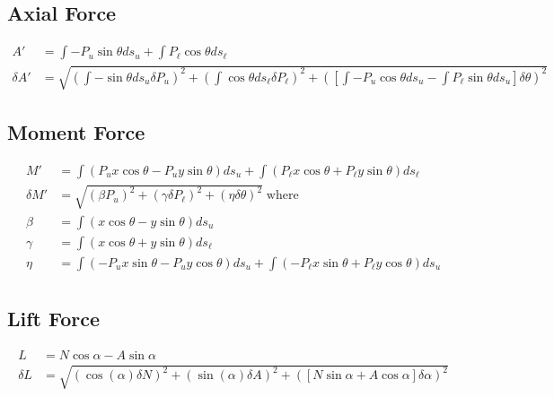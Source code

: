 \documentclass[runningheads]{llncs}
\begin{document}
\subsection{Axial Force}


\begin{align*}
    A' &= \int-P_u\sin\theta ds_u + \int P_\ell\cos\theta ds_\ell \\
    \delta A' &= \sqrt{\left(\int-\sin\theta ds_u\delta P_u\right)^2 + \left(\int\cos\theta ds_\ell\delta P_\ell\right)^2 + \left(\left[\int -P_u\cos\theta ds_u - \int P_\ell\sin\theta ds_u\right]\delta\theta\right)^2}
\end{align*}

\subsection{Moment Force}


\begin{align*}
    M' &= \int \left(P_ux\cos\theta - P_uy\sin\theta\right) ds_u + \int \left(P_\ell x\cos\theta + P_\ell y\sin\theta\right) ds_\ell \\
    \delta M' &= \sqrt{\left(\beta P_u\right)^2 + \left(\gamma\delta P_\ell\right)^2 + \left(\eta\delta\theta\right)^2}\;\text{where}\\
    \beta &= \int \left(x\cos\theta - y\sin\theta\right) ds_u \\
    \gamma &= \int \left(x\cos\theta + y\sin\theta\right) ds_\ell\\
    \eta &= \int \left(-P_ux\sin\theta -P_uy\cos\theta\right)ds_u + \int \left(-P_\ell x\sin\theta + P_\ell y\cos\theta\right) ds_u \\
\end{align*}

\subsection{Lift Force}

\begin{align*}
    L &= N\cos\alpha - A\sin\alpha \\
    \delta L &= \sqrt{\left(\cos(\alpha)\delta N\right)^2 + \left(\sin(\alpha)\delta A\right)^2 + \left(\left[N\sin\alpha + A\cos\alpha\right]\delta \alpha\right)^2}
\end{align*}
\end{document}
